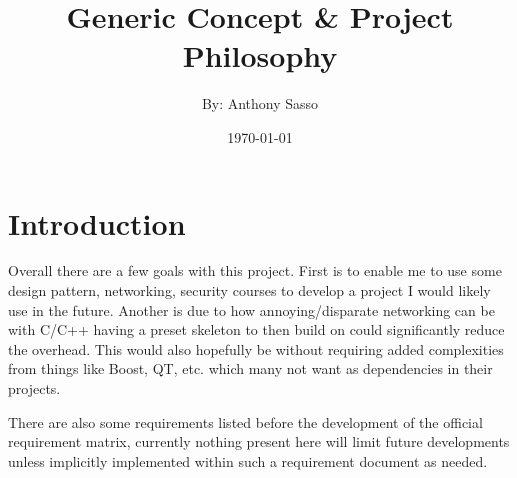 \documentclass{article}
\title      {\Huge Generic Concept \& Project Philosophy}
\author     {By: Anthony Sasso}
\date       {\today}
\begin{document}
\maketitle

\tableofcontents

\newpage
\section{Introduction}
Overall there are a few goals with this project. First is to enable me to use some design pattern, networking, security courses to develop a project I would likely use in the future. Another is due to how annoying/disparate networking can be with C/C++ having a preset skeleton to then build on could significantly reduce the overhead. This would also hopefully be without requiring added complexities from things like Boost, QT, etc. which many not want as dependencies in their projects.

There are also some requirements listed before the development of the official requirement matrix, currently nothing present here will limit future developments unless implicitly implemented within such a requirement document as needed.
\end{document}
